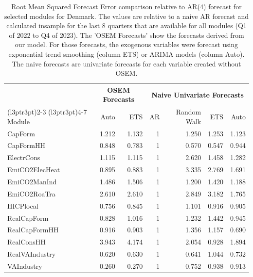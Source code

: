 \begin{table}

\caption{\label{tab:rmsfe_DK}Root Mean Squared Forecast Error comparison relative to AR(4) forecast for selected modules for Denmark. The values are relative to a naive AR forecast and calculated insample for the last 8 quarters that are available for all modules (Q1 of 2022 to Q4 of 2023). The 'OSEM Forecasts' show the forecasts derived from our model. For those forecasts, the exogenous variables were forecast using exponential trend smoothing (column ETS) or ARIMA models (column Auto). The naive forecasts are univariate forecasts for each variable created without OSEM.}
\centering
\begin{tabular}[t]{lrrrrrr}
\toprule
\multicolumn{1}{c}{ } & \multicolumn{2}{c}{OSEM Forecasts} & \multicolumn{4}{c}{Naive Univariate Forecasts} \\
\cmidrule(l{3pt}r{3pt}){2-3} \cmidrule(l{3pt}r{3pt}){4-7}
Module & Auto & ETS & AR & Random Walk & ETS & Auto\\
\midrule
CapForm & 1.212 & 1.132 & 1 & 1.250 & 1.253 & 1.123\\
CapFormHH & 0.848 & 0.783 & 1 & 0.570 & 0.547 & 0.944\\
ElectrCons & 1.115 & 1.115 & 1 & 2.620 & 1.458 & 1.282\\
EmiCO2ElecHeat & 0.895 & 0.883 & 1 & 3.335 & 2.769 & 1.691\\
EmiCO2ManInd & 1.486 & 1.506 & 1 & 1.200 & 1.420 & 1.188\\
\addlinespace
EmiCO2RoaTra & 2.610 & 2.610 & 1 & 2.849 & 3.182 & 1.765\\
HICPlocal & 0.756 & 0.845 & 1 & 1.101 & 0.916 & 0.905\\
RealCapForm & 0.828 & 1.016 & 1 & 1.232 & 1.442 & 0.945\\
RealCapFormHH & 0.916 & 0.903 & 1 & 1.356 & 1.157 & 0.690\\
RealConsHH & 3.943 & 4.174 & 1 & 2.054 & 0.928 & 1.894\\
\addlinespace
RealVAIndustry & 0.620 & 0.630 & 1 & 0.641 & 1.044 & 0.732\\
VAIndustry & 0.260 & 0.270 & 1 & 0.752 & 0.938 & 0.913\\
\bottomrule
\end{tabular}
\end{table}

\begingroup\fontsize{7}{9}\selectfont

